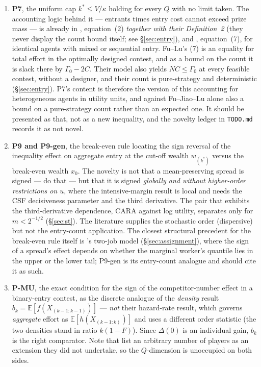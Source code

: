 \documentclass[11pt,a4paper]{article}
\begin{document}
\begin{enumerate}
\item \textbf{P7}, the uniform cap $k^* \leq V/\kappa$ holding for every $Q$
  with no limit taken. The accounting logic behind it --- entrants times entry
  cost cannot exceed prize mass --- is already in \citet{FuJiaoLu2015},
  equation~(2) \emph{together with their Definition~2} (they never display the
  count bound itself; see \S\ref{sec:entry}), and \citet{FuLu2010},
  equation~(7), for identical agents with mixed or sequential entry. Fu--Lu's
  (7) is an equality for total effort in the optimally designed contest, and as
  a bound on the count it is slack there by $\Gamma_0 - 2C$. Their model also
  yields $NC \leq \Gamma_0$ at every feasible contest, without a designer, and
  their count is pure-strategy and deterministic (\S\ref{sec:entry}). P7's
  content is therefore the version of this accounting for heterogeneous agents
  in utility units, and against Fu--Jiao--Lu alone also a bound on a
  pure-strategy count rather than an expected one. It should be presented as
  that, not as a new inequality, and the novelty ledger in \texttt{TODO.md}
  records it as not novel.
\item \textbf{P9 and P9-gen}, the break-even rule locating the sign reversal of
  the inequality effect on aggregate entry at the cut-off wealth $w_{(k^*)}$
  versus the break-even wealth $x_0$. The novelty
  is not that a mean-preserving spread is signed --- \citet{SchroyenTreich2016}
  do that --- but that it is signed \emph{globally and without higher-order
  restrictions on $u$}, where the intensive-margin result is local and needs
  the CSF decisiveness parameter and the third derivative. The pair that
  exhibits the third-derivative dependence, CARA against log utility,
  separates only for $m < 2^{-1/2}$ (\S\ref{sec:st}). The literature supplies
  the stochastic order (dispersive) but not the entry-count application. The
  closest structural precedent for the break-even rule itself is
  \citet{CostrellLoury2004}'s two-job model (\S\ref{sec:assignment}), where the
  sign of a spread's effect depends on whether the marginal worker's quantile
  lies in the upper or the lower tail; P9-gen is its entry-count analogue and
  should cite it as such.
\item \textbf{P-MU}, the exact condition for the sign of the competitor-number
  effect in a binary-entry contest, as the discrete analogue of the
  \citet{RyvkinDrugov2020} \emph{density} result
  $b_k = \mathbb{E}[f(X_{(k-1:k-1)})]$ --- \emph{not} their hazard-rate result,
  which governs \emph{aggregate} effort as
  $\mathbb{E}[h(X_{(k-1:k)})]$ and uses a different order statistic (the two
  densities stand in ratio $k(1-F)$). Since $\Delta(0)$ is an individual gain,
  $b_k$ is the right comparator. Note that \citet{SchroyenTreich2016} list an
  arbitrary number of players as an extension they did not undertake, so the
  $Q$-dimension is unoccupied on both sides.


\end{enumerate}
\end{document}
